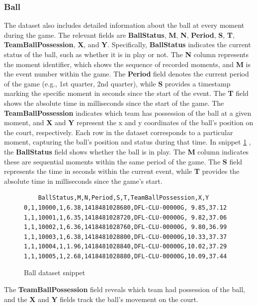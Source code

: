 \subsubsection{Ball}
\label{sect:ball}

The dataset also includes detailed information about the ball at every moment during the game. The relevant fields are \textbf{BallStatus}, \textbf{M}, \textbf{N}, \textbf{Period}, \textbf{S}, \textbf{T}, \textbf{TeamBallPossession}, \textbf{X}, and \textbf{Y}. Specifically, \textbf{BallStatus} indicates the current status of the ball, such as whether it is in play or not. The \textbf{N} column represents the moment identifier, which shows the sequence of recorded moments, and \textbf{M} is the event number within the game. The \textbf{Period} field denotes the current period of the game (e.g., 1st quarter, 2nd quarter), while \textbf{S} provides a timestamp marking the specific moment in seconds since the start of the event. The \textbf{T} field shows the absolute time in milliseconds since the start of the game. The \textbf{TeamBallPossession} indicates which team has possession of the ball at a given moment, and \textbf{X} and \textbf{Y} represent the x and y coordinates of the ball’s position on the court, respectively. Each row in the dataset corresponds to a particular moment, capturing the ball's position and status during that time. In snippet \ref{fig:ball-dataset} , the \textbf{BallStatus} field shows whether the ball is in play. The \textbf{M} column indicates these are sequential moments within the same period of the game. The \textbf{S} field represents the time in seconds within the current event, while \textbf{T} provides the absolute time in milliseconds since the game's start.

\begin{figure}[t]
    \centering
    \begin{BVerbatim}
    BallStatus,M,N,Period,S,T,TeamBallPossession,X,Y
0,1,10000,1,6.38,1418481028680,DFL-CLU-00000G, 9.85,37.12
1,1,10001,1,6.35,1418481028720,DFL-CLU-00000G, 9.82,37.06
1,1,10002,1,6.36,1418481028760,DFL-CLU-00000G, 9.80,36.99
1,1,10003,1,6.38,1418481028800,DFL-CLU-00000G,10.33,37.37
1,1,10004,1,1.96,1418481028840,DFL-CLU-00000G,10.02,37.29
1,1,10005,1,2.68,1418481028880,DFL-CLU-00000G,10.09,37.44
    \end{BVerbatim}
    \caption{Ball dataset snippet}
    \label{fig:ball-dataset}
\end{figure}

The \textbf{TeamBallPossession} field reveals which team had possession of the ball, and the \textbf{X} and \textbf{Y} fields track the ball's movement on the court.


